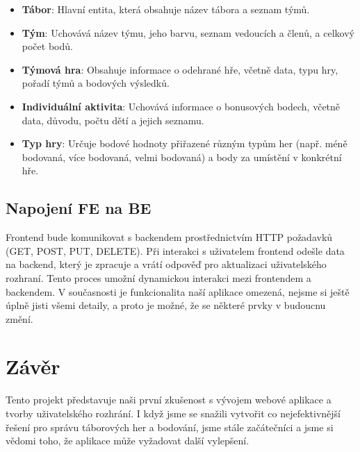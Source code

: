 \documentclass[a4paper, 12pt]{article} %
\begin{document}
\begin{itemize}
    \item \textbf{Tábor}: Hlavní entita, která obsahuje název tábora a seznam týmů.
    \item \textbf{Tým}: Uchovává název týmu, jeho barvu, seznam vedoucích a členů, a celkový 
    počet bodů.
    \item \textbf{Týmová hra}: Obsahuje informace o odehrané hře, včetně data, typu hry, 
    pořadí týmů a bodových výsledků.
    \item \textbf{Individuální aktivita}: Uchovává informace o bonusových bodech, včetně data, 
    důvodu, počtu dětí a jejich seznamu.
    \item \textbf{Typ hry}: Určuje bodové hodnoty přiřazené různým typům her 
    (např. méně bodovaná, více bodovaná, velmi bodovaná) a body za umístění v konkrétní hře.
\end{itemize}

\subsection{Napojení FE na BE}
Frontend bude komunikovat s backendem prostřednictvím HTTP požadavků (GET, POST, PUT, DELETE). 
Při interakci s uživatelem frontend odešle data na backend, který je zpracuje a vrátí 
odpověď pro aktualizaci uživatelského rozhraní. Tento proces umožní dynamickou interakci 
mezi frontendem a backendem. V současnosti je funkcionalita naší aplikace omezená, nejsme 
si ještě úplně jisti všemi detaily, a proto je možné, že se některé prvky v budoucnu změní.

\section{Závěr}

Tento projekt představuje naši první zkušenost s vývojem webové aplikace a tvorby 
uživatelského rozhrání. I když jsme se snažili vytvořit co nejefektivnější řešení pro správu 
táborových her a bodování, jsme stále začátečníci a jsme si vědomi toho, že aplikace může 
vyžadovat další vylepšení.
\end{document}
